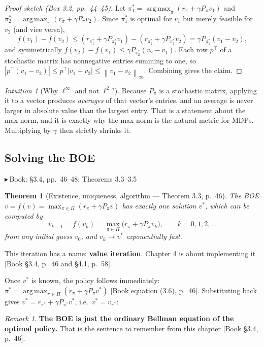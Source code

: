 \documentclass[11pt, letterpaper]{article}
\theoremstyle{runin}
\theoremstyle{runinplain}
\newtheorem{theorem}{Theorem}[section]
\theoremstyle{remark}
\newtheorem*{remark}{Remark}
\newtheorem*{intuition}{Intuition}
\newcommand{\norm}[1]{\left\lVert #1 \right\rVert}
\newcommand{\abs}[1]{\left\lvert #1 \right\rvert}
\newcommand{\argmax}{\operatorname*{arg\,max}}
\newcommand{\bk}[1]{{\color{bookblue}\small$\blacktriangleright$\,\textsf{Book: #1}}}
\newcommand{\bkin}[1]{{\color{bookblue}\small[\textsf{Book #1}]}}
\begin{document}
\begin{proof}[Proof sketch (Box 3.2, pp.~44--45)]
Let $\pi_1^*=\argmax_\pi(r_\pi+\gamma P_\pi v_1)$ and
$\pi_2^*=\argmax_\pi(r_\pi+\gamma P_\pi v_2)$. Since $\pi_1^*$ is optimal for $v_1$
but merely feasible for $v_2$ (and vice versa),
\[
  f(v_1)-f(v_2)\le (r_{\pi_1^*}+\gamma P_{\pi_1^*}v_1)-(r_{\pi_1^*}+\gamma P_{\pi_1^*}v_2)
   =\gamma P_{\pi_1^*}(v_1-v_2),
\]
and symmetrically $f(v_2)-f(v_1)\le\gamma P_{\pi_2^*}(v_2-v_1)$. Each row $p^{\!\top}$
of a stochastic matrix has nonnegative entries summing to one, so
$\abs{p^{\!\top}(v_1-v_2)}\le p^{\!\top}\abs{v_1-v_2}\le\norm{v_1-v_2}_\infty$.
Combining gives the claim.
\end{proof}

\begin{intuition}[Why $\ell^\infty$ and not $\ell^2$?]
Because $P_\pi$ is a stochastic matrix, applying it to a vector produces
\emph{averages} of that vector's entries, and an average is never larger in
absolute value than the largest entry. That is a statement about the max-norm, and
it is exactly why the max-norm is the natural metric for MDPs. Multiplying by
$\gamma$ then strictly shrinks it.
\end{intuition}

\subsection{Solving the BOE}

\bk{\S3.4, pp.~46--48; Theorems 3.3--3.5}

\begin{theorem}[Existence, uniqueness, algorithm --- Theorem 3.3, p.~46]
The BOE $v=f(v)=\max_{\pi\in\Pi}(r_\pi+\gamma P_\pi v)$ has exactly one solution
$v^*$, which can be computed by
\[
  v_{k+1}=f(v_k)=\max_{\pi\in\Pi}\bigl(r_\pi+\gamma P_\pi v_k\bigr),
  \qquad k=0,1,2,\dots
\]
from any initial guess $v_0$, and $v_k\to v^*$ exponentially fast.
\end{theorem}

This iteration has a name: \textbf{value iteration}. Chapter 4 is about
implementing it \bkin{\S3.4, p.~46 and \S4.1, p.~58}.

Once $v^*$ is known, the policy follows immediately:
$\pi^*=\argmax_{\pi\in\Pi}(r_\pi+\gamma P_\pi v^*)$ \bkin{equation (3.6), p.~46}.
Substituting back gives $v^*=r_{\pi^*}+\gamma P_{\pi^*}v^*$, i.e.\
$v^*=v_{\pi^*}$:

\begin{remark}
\textbf{The BOE is just the ordinary Bellman equation of the optimal policy.} That
is the sentence to remember from this chapter \bkin{\S3.4, p.~46}.
\end{remark}
\end{document}
